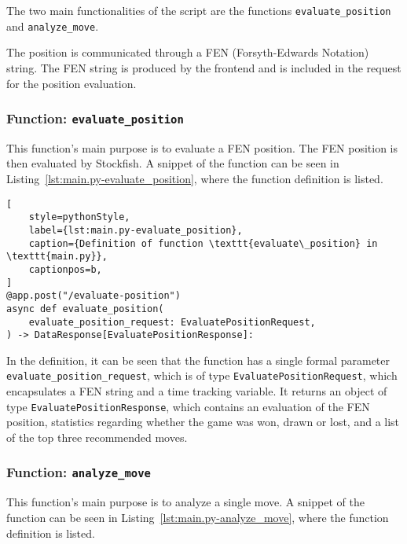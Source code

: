 The two main functionalities of the script are the functions \texttt{evaluate\_position} and \texttt{analyze\_move}.

The position is communicated through a FEN (Forsyth-Edwards Notation) string.
The FEN string is produced by the frontend and is included in the request for the position evaluation.


\subsubsection{Function: \texttt{evaluate\_position}}\label{subsubsec:function:evaluate_position}

This function's main purpose is to evaluate a FEN position.
The FEN position is then evaluated by Stockfish.
A snippet of the function can be seen in Listing~\ref{lst:main.py-evaluate_position}, where the function definition is
listed.

\begin{lstlisting}[
    style=pythonStyle,
    label={lst:main.py-evaluate_position},
    caption={Definition of function \texttt{evaluate\_position} in \texttt{main.py}},
    captionpos=b,
]
@app.post("/evaluate-position")
async def evaluate_position(
    evaluate_position_request: EvaluatePositionRequest,
) -> DataResponse[EvaluatePositionResponse]:
\end{lstlisting}

In the definition, it can be seen that the function has a single formal parameter \texttt{evaluate\_position\_request},
which is of type \texttt{EvaluatePositionRequest}, which encapsulates a FEN string and a time tracking variable.
It returns an object of type \texttt{EvaluatePositionResponse}, which contains an evaluation of the FEN position,
statistics regarding whether the game was won, drawn or lost, and a list of the top three recommended moves.


\subsubsection{Function: \texttt{analyze\_move}}\label{subsubsec:function:analyze_move}

This function's main purpose is to analyze a single move.
A snippet of the function can be seen in Listing~\ref{lst:main.py-analyze_move}, where the function definition is
listed.

